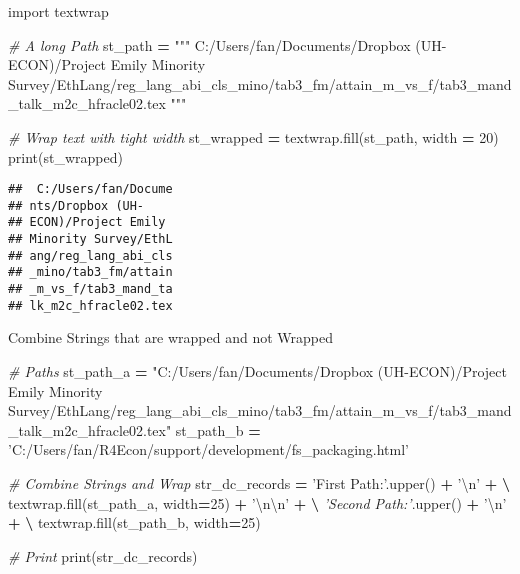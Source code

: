 \documentclass[
]{book}
\newenvironment{Shaded}{\begin{snugshade}}{\end{snugshade}}
\newcommand{\BuiltInTok}[1]{#1}
\newcommand{\CharTok}[1]{\textcolor[rgb]{0.31,0.60,0.02}{#1}}
\newcommand{\CommentTok}[1]{\textcolor[rgb]{0.56,0.35,0.01}{\textit{#1}}}
\newcommand{\DecValTok}[1]{\textcolor[rgb]{0.00,0.00,0.81}{#1}}
\newcommand{\ImportTok}[1]{#1}
\newcommand{\NormalTok}[1]{#1}
\newcommand{\OperatorTok}[1]{\textcolor[rgb]{0.81,0.36,0.00}{\textbf{#1}}}
\newcommand{\StringTok}[1]{\textcolor[rgb]{0.31,0.60,0.02}{#1}}
\begin{document}
\begin{Shaded}
\begin{Highlighting}[]
\ImportTok{import}\NormalTok{ textwrap}

\CommentTok{# A long Path}
\NormalTok{st_path }\OperatorTok{=} \StringTok{"""}
\StringTok{C:/Users/fan/Documents/Dropbox (UH-ECON)/Project Emily Minority Survey/EthLang/reg_lang_abi_cls_mino/tab3_fm/attain_m_vs_f/tab3_mand_talk_m2c_hfracle02.tex}
\StringTok{"""}

\CommentTok{# Wrap text with tight width}
\NormalTok{st_wrapped }\OperatorTok{=}\NormalTok{ textwrap.fill(st_path, width }\OperatorTok{=} \DecValTok{20}\NormalTok{)}
\BuiltInTok{print}\NormalTok{(st_wrapped)}
\end{Highlighting}
\end{Shaded}

\begin{verbatim}
##  C:/Users/fan/Docume
## nts/Dropbox (UH-
## ECON)/Project Emily
## Minority Survey/EthL
## ang/reg_lang_abi_cls
## _mino/tab3_fm/attain
## _m_vs_f/tab3_mand_ta
## lk_m2c_hfracle02.tex
\end{verbatim}

Combine Strings that are wrapped and not Wrapped

\begin{Shaded}
\begin{Highlighting}[]

\CommentTok{# Paths}
\NormalTok{st_path_a }\OperatorTok{=} \StringTok{"C:/Users/fan/Documents/Dropbox (UH-ECON)/Project Emily Minority Survey/EthLang/reg_lang_abi_cls_mino/tab3_fm/attain_m_vs_f/tab3_mand_talk_m2c_hfracle02.tex"}
\NormalTok{st_path_b }\OperatorTok{=} \StringTok{'C:/Users/fan/R4Econ/support/development/fs_packaging.html'}

\CommentTok{# Combine Strings and Wrap}
\NormalTok{str_dc_records }\OperatorTok{=} \StringTok{'First Path:'}\NormalTok{.upper() }\OperatorTok{+} \StringTok{'}\CharTok{\textbackslash{}n}\StringTok{'} \OperatorTok{+} \OperatorTok{\textbackslash{}}
\NormalTok{                 textwrap.fill(st_path_a, width}\OperatorTok{=}\DecValTok{25}\NormalTok{) }\OperatorTok{+} \StringTok{'}\CharTok{\textbackslash{}n\textbackslash{}n}\StringTok{'} \OperatorTok{+} \OperatorTok{\textbackslash{}}
                 \CommentTok{'Second Path:'}\NormalTok{.upper() }\OperatorTok{+} \StringTok{'}\CharTok{\textbackslash{}n}\StringTok{'} \OperatorTok{+} \OperatorTok{\textbackslash{}}
\NormalTok{                 textwrap.fill(st_path_b, width}\OperatorTok{=}\DecValTok{25}\NormalTok{)}
              
\CommentTok{# Print}
\BuiltInTok{print}\NormalTok{(str_dc_records)                 }
\end{Highlighting}
\end{Shaded}
\end{document}
